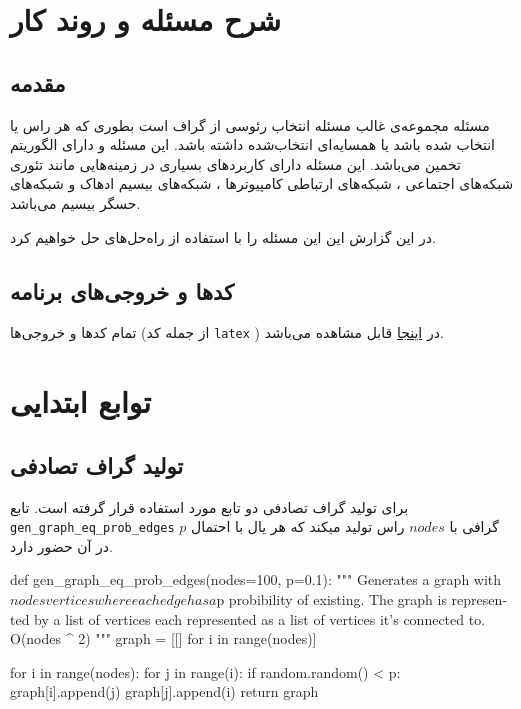 \chapter{شرح مسئله و روند کار}

\section{مقدمه}
مسئله مجموعه‌ی غالب مسئله انتخاب رئوسی از گراف است بطوری که هر راس یا انتخاب شده باشد یا همسایه‌ای انتخاب‌شده داشته باشد. این مسئله
و دارای  الگوریتم تخمین می‌باشد.
این مسئله دارای کاربردهای بسیاری در زمینه‌هایی
 مانند تئوری شبکه‌های اجتماعی
 ، شبکه‌های ارتباطی کامپیوتر‌ها
 ، شبکه‌های بیسیم ادهاک
  و شبکه‌های حسگر بیسیم
می‌باشد.
\cite{sasireka2014applications}

در این گزارش این این مسئله را با استفاده از راه‌حل‌های 
حل خواهیم کرد.

\section{کدها و خروجی‌های برنامه}
تمام کد‌ها و خروجی‌ها (از جمله کد
\verb;latex;
)
در
\href{https://github.com/atrin-hojjat/Uni-AI-Course-Reports/blob/main/Report\%2002/}{اینجا}
قابل مشاهده می‌باشد.

\chapter{توابع ابتدایی}
\section{تولید گراف تصادفی}
برای تولید گراف تصادفی دو تابع مورد استفاده قرار گرفته است.
تابع
\verb;gen_graph_eq_prob_edges;
گرافی با
$nodes$
راس تولید میکند که هر یال با احتمال
$p$
در آن حضور دارد.
\begin{latin}
\begin{python}
def gen_graph_eq_prob_edges(nodes=100, p=0.1):
    """
    Generates a graph with $nodes vertices where each edge has a $p probibility of existing. 
    The graph is represented by a list of vertices each represented as a list of vertices it's connected to.
    O(nodes ^ 2)
    """
    graph = [[] for i in range(nodes)]

    for i in range(nodes):
        for j in range(i):
            if random.random() < p:
                graph[i].append(j)
                graph[j].append(i)
    return graph

\end{python}
\end{latin}

